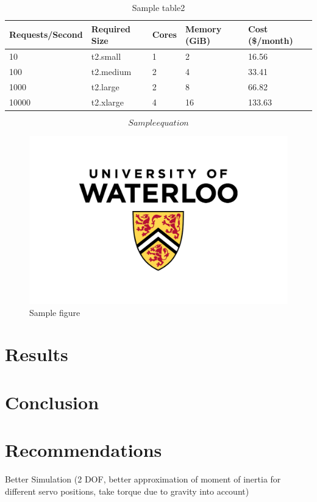 \documentclass[letterpaper,12pt]{article}
\begin{document}
\begin{table}[H]
	\begin{center}
		\caption{Sample table2}
        \label{tab:sampletable}
        \begin{tabular}{l|l|l|l|l}
        Requests/Second & Required Size & Cores & Memory (GiB) & Cost (\$/month)\\
        \hline
        10 & t2.small & 1 & 2 & 16.56\\
        100 & t2.medium & 2 & 4 & 33.41\\
        1000 & t2.large & 2 & 8 & 66.82\\
        10000 & t2.xlarge & 4 & 16 & 133.63\\
        \end{tabular}
	\end{center}
\end{table}

\begin{equation}
\label{eq:equation}
Sample equation
\end{equation}

\begin{figure}[H]
\centering \includegraphics[width=0.8\columnwidth]{UW.jpg}
\caption{\label{fig:figure}Sample figure}
\end{figure}
\pagebreak

\section{Results}

\section{Conclusion}

\section{Recommendations}
Better Simulation (2 DOF, better approximation of moment of inertia for different servo positions, take torque due to gravity into account)
\end{document}
